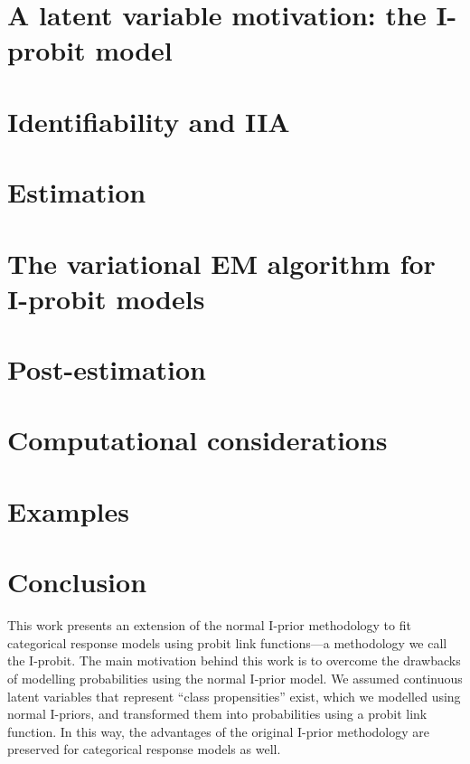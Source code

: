 \documentclass[showframe,11pt,twoside,openright]{report}
\begin{document}
\section{A latent variable motivation: the I-probit model}\label{sec:iprobitlatentvarmot}


\section{Identifiability and IIA}\label{sec:iia}


\section{Estimation}


\section{The variational EM algorithm for I-probit models}\label{sec:iprobitvar}


\section{Post-estimation}\label{sec:iprobitpostest}


\section{Computational considerations}


\section{Examples}
\label{sec:iprobiteg}


\section{Conclusion}
\label{sec:iprobitconcl}

This work presents an extension of the normal I-prior methodology to fit categorical response models using probit link functions---a methodology we call the I-probit.
The main motivation behind this work is to overcome the drawbacks of modelling probabilities using the normal I-prior model.
We assumed continuous latent variables that represent ``class propensities'' exist, which we modelled using normal I-priors, and transformed them into probabilities using a probit link function.
In this way, the advantages of the original I-prior methodology are preserved for categorical response models as well.
\end{document}
